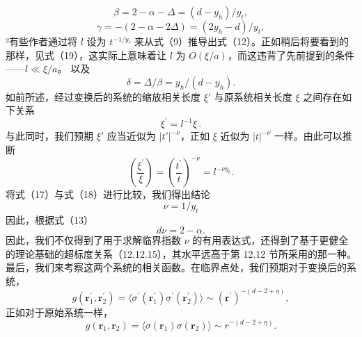 \begin{equation}\tag{14.1.14}\label{eq:14.1.14}
\beta = 2 - \alpha - \Delta = ( d - y _ { h } ) / y _ { t } ,
\end{equation}
\begin{equation}\tag{14.1.15}\label{eq:14.1.15}
\gamma = - ( 2 - \alpha - 2 \Delta ) = ( 2 y _ { h } - d ) / y _ { t } ,
\end{equation}
²有些作者通过将 \(l\) 设为 \(t^{-1/y_t}\) 来从式（9）推导出式（12）。正如稍后将要看到的那样，见式（19），这实际上意味着让 \(l\) 为 \(O(\xi/a)\)，而这违背了先前提到的条件——\(l \ll \xi/a\)。
以及
\begin{equation}\tag{14.1.16}\label{eq:14.1.16}
\delta = \Delta / \beta = y _ { h } / ( d - y _ { h } ) .
\end{equation}
如前所述，经过变换后的系统的缩放相关长度 \(\xi'\) 与原系统相关长度 \(\xi\) 之间存在如下关系
\begin{equation}\tag{14.1.17}\label{eq:14.1.17}
\xi ^{\prime} = l ^{- 1} \xi \, .
\end{equation}
与此同时，我们预期 \(\xi'\) 应当近似为 \(|t'|^{-\nu}\)，正如 \(\xi\) 近似为 \(|t|^{-\nu}\) 一样。由此可以推断
\begin{equation}\tag{14.1.18}\label{eq:14.1.18}
\left( \frac { \xi ^{\prime} } { \xi } \right) = \left( \frac { t ^{\prime} } { t } \right) ^{- \nu} = l ^{- \nu y _ { t} } .
\end{equation}
将式（17）与式（18）进行比较，我们得出结论
\begin{equation}\tag{14.1.19}\label{eq:14.1.19}
\nu = 1 / y _ { t }
\end{equation}
因此，根据式（13）
\begin{equation}\tag{14.1.20}\label{eq:14.1.20}
d \nu = 2 - \alpha .
\end{equation}
因此，我们不仅得到了用于求解临界指数 \(\nu\) 的有用表达式，还得到了基于更健全的理论基础的超标度关系（12.12.15），其水平远高于第 12.12 节所采用的那一种。
最后，我们来考察这两个系统的相关函数。在临界点处，我们预期对于变换后的系统，
\begin{equation}\tag{14.1.21}\label{eq:14.1.21}
g ( \pmb { r } _ { 1 } ^{\prime} , \pmb { r } _ { 2 } ^{\prime} ) = \langle \sigma ^{\prime} ( \pmb { r } _ { 1 } ^{\prime} ) \sigma ^{\prime} ( \pmb { r } _ { 2 } ^{\prime} ) \rangle \sim ( \pmb { r } ^{\prime} ) ^{- ( d - 2 + \eta )} ,
\end{equation}
正如对于原始系统一样，
\begin{equation}\tag{14.1.22}\label{eq:14.1.22}
g ( \pmb { r } _ { 1 } , \pmb { r } _ { 2 } ) = \langle \sigma ( \pmb { r } _ { 1 } ) \sigma ( \pmb { r } _ { 2 } ) \rangle \sim r ^{- ( d - 2 + \eta )} .
\end{equation}

